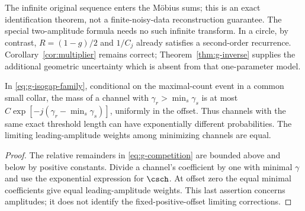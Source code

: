 The infinite original sequence enters the M\"obius sums; this is an exact
identification theorem, not a finite-noisy-data reconstruction guarantee.
The special two-amplitude formula needs no such infinite transform.
In a circle, by contrast, $R=(1-g)/2$ and $1/C_j$ already satisfies a
second-order recurrence. Corollary~\ref{cor:multiplier} remains correct;
Theorem~\ref{thm:g-inverse} supplies the additional geometric uncertainty
which is absent from that one-parameter model.

\begin{corollary}
\label{cor:g-selection}
In \eqref{eq:g-isogap-family}, conditional on the maximal-count event
in a common small collar, the mass of a channel with
$\gamma_r>\min_s\gamma_s$ is at most
$C\exp[-j(\gamma_r-\min_s\gamma_s)]$, uniformly in the offset.
Thus channels with the same exact threshold length can have exponentially
different probabilities. The limiting leading-amplitude weights among
minimizing channels are equal.
\end{corollary}
\begin{proof}
The relative remainders in \eqref{eq:g-competition} are bounded above
and below by positive constants. Divide a channel's coefficient by
one with minimal $\gamma$ and use the exponential expression for
$\csch$. At offset zero the equal minimal coefficients give equal
leading-amplitude weights. This last assertion concerns amplitudes;
it does not identify the fixed-positive-offset limiting corrections.
\end{proof}
